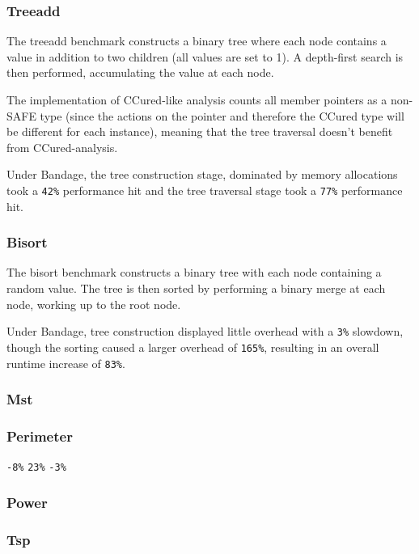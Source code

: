 \subsubsection{Treeadd}

The treeadd benchmark constructs a binary tree where each node contains a value in addition to two children (all values are set to 1).
A depth-first search is then performed, accumulating the value at each node.

The implementation of CCured-like analysis counts all member pointers as a non-SAFE type (since the actions on the pointer and therefore the CCured type will be different for each instance), meaning that the tree traversal doesn't benefit from CCured-analysis.

Under Bandage, the tree construction stage, dominated by memory allocations took a \verb!42%! performance hit and the tree traversal stage took a \verb!77%! performance hit.


\subsubsection{Bisort}

The bisort benchmark constructs a binary tree with each node containing a random value.
The tree is then sorted by performing a binary merge at each node, working up to the root node.

Under Bandage, tree construction displayed little overhead with a \verb!3%! slowdown, though the sorting caused a larger overhead of \verb!165%!, resulting in an overall runtime increase of \verb!83%!.

\subsubsection{Mst}
\subsubsection{Perimeter}
\verb!-8%!
\verb!23%!
\verb!-3%!
\subsubsection{Power}
\subsubsection{Tsp}

